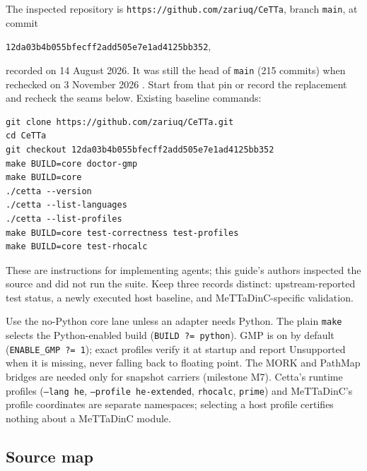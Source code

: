 \documentclass[11pt]{article}
\newcommand{\code}[1]{\texttt{#1}}
\begin{document}
The inspected repository is \code{https://github.com/zariuq/CeTTa}, branch \code{main}, at commit
\begin{center}\code{12da03b4b055bfecff2add505e7e1ad4125bb352},\end{center}
recorded on 14 August 2026. It was still the head of \code{main} (215 commits) when rechecked on 3
November 2026 \cite{cettarepo}. Start from that pin or record the replacement and recheck the seams
below. Existing baseline commands:
\begin{lstlisting}
git clone https://github.com/zariuq/CeTTa.git
cd CeTTa
git checkout 12da03b4b055bfecff2add505e7e1ad4125bb352
make BUILD=core doctor-gmp
make BUILD=core
./cetta --version
./cetta --list-languages
./cetta --list-profiles
make BUILD=core test-correctness test-profiles
make BUILD=core test-rhocalc
\end{lstlisting}
These are instructions for implementing agents; this guide's authors inspected the source and did
not run the suite. Keep three records distinct: upstream-reported test status, a newly executed host
baseline, and MeTTaDinC-specific validation.

Use the no-Python core lane unless an adapter needs Python. The plain \code{make} selects the
Python-enabled build (\code{BUILD ?= python}). GMP is on by default (\code{ENABLE\_GMP ?= 1}); exact
profiles verify it at startup and report Unsupported when it is missing, never falling back to
floating point. The MORK and PathMap bridges are needed only for snapshot carriers (milestone M7).
Cetta's runtime profiles (\code{--lang he}, \code{--profile he-extended}, \code{rhocalc}, \code{prime})
and MeTTaDinC's profile coordinates are separate namespaces; selecting a host profile certifies nothing
about a MeTTaDinC module.

\subsection{Source map}
\end{document}
